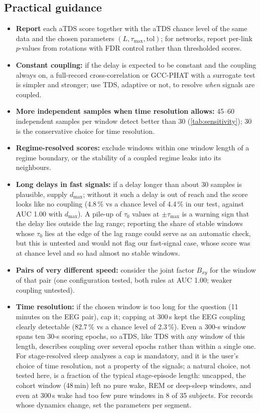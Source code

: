 \documentclass[11pt,a4paper]{article}
\begin{document}
\subsection*{Practical guidance}
\label{sec:guidance}
\begin{itemize}
\item \textbf{Report} each aTDS score together with the aTDS chance level of the same data and the chosen parameters $(L, \tau_{\max}, \mathrm{tol})$; for networks, report per-link $p$-values from rotations with FDR control rather than thresholded scores.
\item \textbf{Constant coupling:} if the delay is expected to be constant and the coupling always on, a full-record cross-correlation or GCC-PHAT with a surrogate test is simpler and stronger; use TDS, adaptive or not, to resolve \emph{when} signals are coupled.
\item \textbf{More independent samples when time resolution allows:} 45--60 independent samples per window detect better than 30 (\cref{tab:sensitivity}); 30 is the conservative choice for time resolution.
\item \textbf{Regime-resolved scores:} exclude windows within one window length of a regime boundary, or the stability of a coupled regime leaks into its neighbours.
\item \textbf{Long delays in fast signals:} if a delay longer than about 30 samples is plausible, supply $d_{\max}$; without it such a delay is out of reach and the score looks like no coupling (4.8\,\% vs a chance level of 4.4\,\% in our test, against AUC 1.00 with $d_{\max}$). A pile-up of $\tau_0$ values at $\pm\tau_{\max}$ is a warning sign that the delay lies outside the lag range; reporting the share of stable windows whose $\tau_0$ lies at the edge of the lag range could serve as an automatic check, but this is untested and would not flag our fast-signal case, whose score was at chance level and so had almost no stable windows.
\item \textbf{Pairs of very different speed:} consider the joint factor $B_{xy}$ for the window of that pair (one configuration tested, both rules at AUC 1.00; weaker coupling untested).
\item \textbf{Time resolution:} if the chosen window is too long for the question (11 minutes on the EEG pair), cap it; capping at 300\,s kept the EEG coupling clearly detectable (82.7\,\% vs a chance level of 2.3\,\%). Even a 300-s window spans ten 30-s scoring epochs, so aTDS, like TDS with any window of this length, describes coupling over several epochs rather than within a single one. For stage-resolved sleep analyses a cap is mandatory, and it is the user's choice of time resolution, not a property of the signals; a natural choice, not tested here, is a fraction of the typical stage-episode length: uncapped, the cohort window (48\,min) left no pure wake, REM or deep-sleep windows, and even at 300\,s wake had too few pure windows in 8 of 35 subjects. For records whose dynamics change, set the parameters per segment.

\end{itemize}
\end{document}
